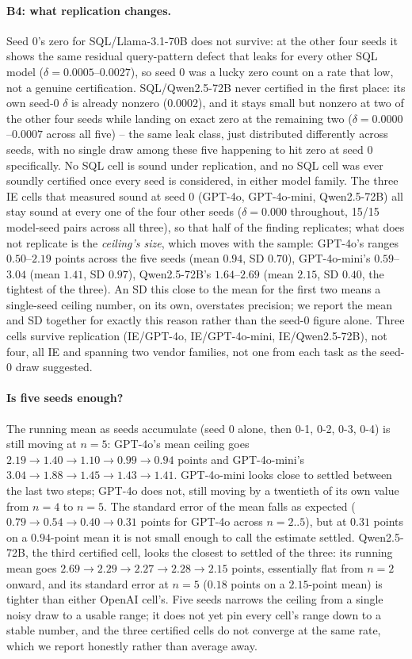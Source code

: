 \documentclass[11pt]{article}
\begin{document}
\paragraph{B4: what replication changes.} Seed 0's zero for SQL/Llama-3.1-70B
does not survive: at the other four seeds it shows the
same residual query-pattern defect that leaks for every other SQL model
($\delta=0.0005$--$0.0027$), so seed 0
was a lucky zero count on a rate that low, not a genuine
certification. SQL/Qwen2.5-72B never certified in the first place: its
own seed-0 $\delta$ is already nonzero ($0.0002$), and it stays small but
nonzero at two of the other four seeds while landing on exact zero at
the remaining two ($\delta=0.0000$--$0.0007$ across all five) -- the same
leak class, just distributed differently across seeds, with no single
draw among these five happening to hit zero at seed 0 specifically. No
SQL cell is sound under replication, and no SQL cell was ever soundly
certified once every seed is considered, in either model family. The three IE cells that
measured sound at seed 0 (GPT-4o, GPT-4o-mini, Qwen2.5-72B) all stay sound
at every one of the four other seeds ($\delta=0.000$ throughout, 15/15
model-seed pairs across all three), so that half of the finding
replicates; what does not replicate is the
\emph{ceiling's size}, which moves with the sample: GPT-4o's ranges $0.50$--$2.19$
points across the five seeds (mean $0.94$, SD $0.70$), GPT-4o-mini's $0.59$--$3.04$
(mean $1.41$, SD $0.97$), Qwen2.5-72B's $1.64$--$2.69$ (mean $2.15$, SD $0.40$,
the tightest of the three). An SD this close to the mean for the first two
means a single-seed ceiling number, on its own, overstates precision; we
report the mean and SD
together for exactly this reason rather than the seed-0 figure alone. Three
cells survive replication (IE/GPT-4o, IE/GPT-4o-mini, IE/Qwen2.5-72B), not
four, all IE and spanning two vendor families, not one from each
task as the seed-0 draw suggested.

\paragraph{Is five seeds enough?} The running mean as seeds accumulate
(seed 0 alone, then 0-1, 0-2, 0-3, 0-4) is still moving at $n{=}5$:
GPT-4o's mean ceiling goes $2.19\to1.40\to1.10\to0.99\to0.94$ points and
GPT-4o-mini's $3.04\to1.88\to1.45\to1.43\to1.41$. GPT-4o-mini looks close
to settled between the last two steps; GPT-4o does not, still moving by
a twentieth of its own value from $n{=}4$ to $n{=}5$. The standard error
of the mean falls as expected ($0.79\to0.54\to0.40\to0.31$ points for
GPT-4o across $n{=}2..5$), but at $0.31$ points on a $0.94$-point mean it
is not small enough to call the estimate settled. Qwen2.5-72B, the third
certified cell, looks the closest to settled of the three: its running
mean goes $2.69\to2.29\to2.27\to2.28\to2.15$ points, essentially flat from
$n{=}2$ onward, and its standard error at $n{=}5$ ($0.18$ points on a
$2.15$-point mean) is tighter than either OpenAI cell's. Five seeds narrows the
ceiling from a single noisy draw to a usable range; it does not yet
pin every cell's range down to a stable number, and the three certified
cells do not converge at the same rate, which we report honestly rather
than average away.
\end{document}
